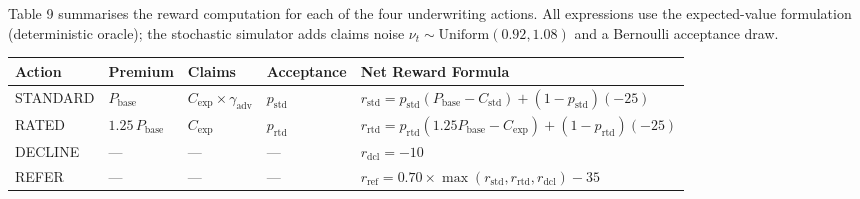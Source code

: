 Table 9 summarises the reward computation for each of the four underwriting actions. All expressions use the expected-value formulation (deterministic oracle); the stochastic simulator adds claims noise \(\nu_t \sim \text{Uniform}(0.92, 1.08)\) and a Bernoulli acceptance draw.

\label{tab:4.7.2}

{\def\LTcaptype{none} %
\begin{longtable}[]{@{}
  >{\raggedright\arraybackslash}p{}
  >{\raggedright\arraybackslash}p{}
  >{\raggedright\arraybackslash}p{}
  >{\raggedright\arraybackslash}p{}
  >{\raggedright\arraybackslash}p{}@{}}
\toprule\noalign{}
\begin{minipage}[b]{\linewidth}\raggedright
Action
\end{minipage} & \begin{minipage}[b]{\linewidth}\raggedright
Premium
\end{minipage} & \begin{minipage}[b]{\linewidth}\raggedright
Claims
\end{minipage} & \begin{minipage}[b]{\linewidth}\raggedright
Acceptance
\end{minipage} & \begin{minipage}[b]{\linewidth}\raggedright
Net Reward Formula
\end{minipage} \\
\midrule\noalign{}
\endhead
\bottomrule\noalign{}
\endlastfoot
STANDARD & \(P_{\text{base}}\) & \(C_{\text{exp}} \times \gamma_{\text{adv}}\) & \(p_{\text{std}}\) & \(r_{\text{std}} = p_{\text{std}}(P_{\text{base}} - C_{\text{std}}) + (1-p_{\text{std}})(-25)\) \\
RATED & \(1.25 \, P_{\text{base}}\) & \(C_{\text{exp}}\) & \(p_{\text{rtd}}\) & \(r_{\text{rtd}} = p_{\text{rtd}}(1.25 P_{\text{base}} - C_{\text{exp}}) + (1-p_{\text{rtd}})(-25)\) \\
DECLINE & --- & --- & --- & \(r_{\text{dcl}} = -10\) \\
REFER & --- & --- & --- & \(r_{\text{ref}} = 0.70 \times \max(r_{\text{std}}, r_{\text{rtd}}, r_{\text{dcl}}) - 35\) \\
\end{longtable}
}

